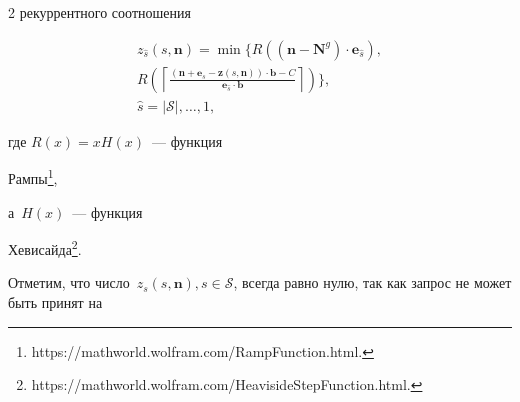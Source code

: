 \begin{multicols}{2}
рекуррентного соотношения





\vspace*{-6pt}





\noindent


\begin{multline}


\label{eq:capabilityFunc}


z_{\hat{s}}\left(s,\mathbf{n}\right) = \min


\biggl\{


R \left(\left(\mathbf{n}-\mathbf{N}^{g}\right) \cdot 


\mathbf{e}_{\hat{s}}\right), \\[-3pt]


R \left(\left\lceil \frac{\left(\mathbf{n}+\mathbf{e}_s - 


\mathbf{z}\left(s,\mathbf{n}\right) \right)\cdot\mathbf{b} - 


C}{\mathbf{e}_{\hat{s}}\cdot\mathbf{b}} \right\rceil\right)\!\!


\biggl\},\\[-3pt]


\hat{s} = \lvert\mathcal{S}\rvert,\ldots,1,


\end{multline}





\columnbreak





\noindent


где $R\left(x\right)=xH\left(x\right)$~--- функция 


Рампы\footnote{{\sf https://mathworld.wolfram.com/RampFunction.html.}}, 


а~$H\left(x\right)$~--- функция 


Хевисайда\footnote{{\sf https://mathworld.wolfram.com/HeavisideStepFunction.html.}}.





\smallskip





Отметим, что число~$z_s\left(s,\mathbf{n}\right), 


s\in\mathcal{S}$, всегда равно нулю, так как запрос не может быть принят на 



\end{multicols}
